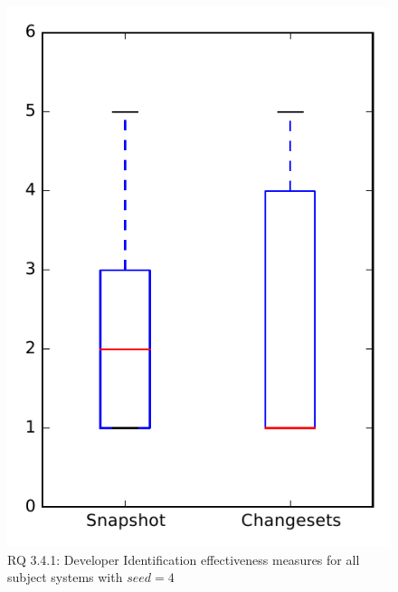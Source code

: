 
\begin{figure}
\centering
\includegraphics[height=0.4\textheight]{figures/dit_seed/rq1_overview_4}
\caption{RQ 3.4.1: Developer Identification effectiveness measures for all subject systems with $seed=4$}
\label{fig:dit_seed:rq1:overview}
\end{figure}
